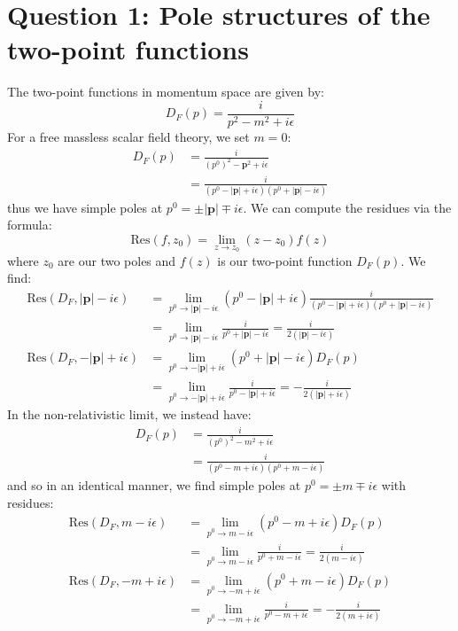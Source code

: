 \documentclass[12pt]{article}
\begin{document}
\section*{Question 1: Pole structures of the two-point functions}
The two-point functions in momentum space are given by:
\begin{equation*}
    D_F(p) = \frac{i}{p^2 - m^2 + i\epsilon}
\end{equation*}
For a free massless scalar field theory, we set $m=0$:
\begin{align*}
    D_F(p) &= \frac{i}{(p^0)^2 - \mathbf{p}^2 + i\epsilon} \\
    &= \frac{i}{(p^0 - |\mathbf{p}| + i\epsilon)(p^0 + |\mathbf{p}| - i\epsilon)}
\end{align*}
thus we have simple poles at $p^0 = \pm |\mathbf{p}| \mp i\epsilon$. We can compute the
residues via the formula:
\begin{equation*}
    \text{Res}(f, z_0) = \lim_{z \to z_0} (z - z_0) f(z)
\end{equation*}
where $z_0$ are our two poles and $f(z)$ is our two-point function $D_F(p)$. We find:
\begin{align*}
    \text{Res}(D_F, |\mathbf{p}| - i\epsilon) &= \lim_{p^0 \to |\mathbf{p}| -
    i\epsilon} (p^0 - |\mathbf{p}| + i\epsilon) \frac{i}{(p^0 - |\mathbf{p}| + i\epsilon)(p^0 + |\mathbf{p}| - i\epsilon)}
 \\
    &= \lim_{p^0 \to |\mathbf{p}| - i\epsilon} \frac{i}{p^0 + |\mathbf{p}| -
    i\epsilon} = \frac{i}{2(|\mathbf{p}|  - i\epsilon)} \\
    \text{Res}(D_F, -|\mathbf{p}| + i\epsilon) &= \lim_{p^0 \to -|\mathbf{p}| +
    i\epsilon} (p^0 + |\mathbf{p}| - i\epsilon) D_F(p) \\
    &= \lim_{p^0 \to -|\mathbf{p}| + i\epsilon} \frac{i}{p^0 - |\mathbf{p}| +
    i\epsilon} = -\frac{i}{2(|\mathbf{p}| + i\epsilon)}
\end{align*}
In the non-relativistic limit, we instead have:
\begin{align*}
    D_F(p) &= \frac{i}{(p^0)^2 - m^2 + i\epsilon} \\
    &= \frac{i}{(p^0 - m + i\epsilon)(p^0 + m - i\epsilon)}
\end{align*}
and so in an identical manner, we find simple poles at $p^0 = \pm m \mp i\epsilon$ with
residues:
\begin{align*}
    \text{Res}(D_F, m - i\epsilon) &= \lim_{p^0 \to m - i\epsilon} (p^0 - m + i\epsilon)
    D_F(p) \\
    &= \lim_{p^0 \to m - i\epsilon} \frac{i}{p^0 + m - i\epsilon} = \frac{i}{2(m - i\epsilon)} \\
    \text{Res}(D_F, -m + i\epsilon) &= \lim_{p^0 \to -m + i\epsilon} (p^0 + m - i\epsilon)
    D_F(p) \\
    &= \lim_{p^0 \to -m + i\epsilon} \frac{i}{p^0 - m + i\epsilon} = -\frac{i}{2(m + i\epsilon)} \\
\end{align*}
\end{document}

